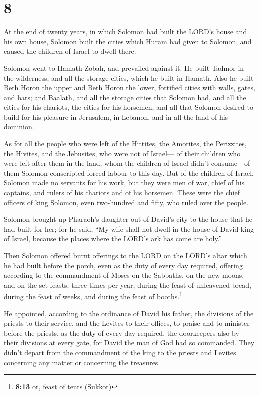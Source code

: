 \hypertarget{section-7}{%
\section{8}\label{section-7}}

 At the end of twenty years, in which Solomon had built
the LORD's house and his own house,  Solomon built the
cities which Huram had given to Solomon, and caused the children of
Israel to dwell there.

 Solomon went to Hamath Zobah, and prevailed against it.
 He built Tadmor in the wilderness, and all the storage
cities, which he built in Hamath.  Also he built Beth
Horon the upper and Beth Horon the lower, fortified cities with walls,
gates, and bars;  and Baalath, and all the storage cities
that Solomon had, and all the cities for his chariots, the cities for
his horsemen, and all that Solomon desired to build for his pleasure in
Jerusalem, in Lebanon, and in all the land of his dominion.

 As for all the people who were left of the Hittites, the
Amorites, the Perizzites, the Hivites, and the Jebusites, who were not
of Israel---  of their children who were left after them
in the land, whom the children of Israel didn't consume---of them
Solomon conscripted forced labour to this day.  But of the
children of Israel, Solomon made no servants for his work, but they were
men of war, chief of his captains, and rulers of his chariots and of his
horsemen.  These were the chief officers of king Solomon,
even two-hundred and fifty, who ruled over the people.

 Solomon brought up Pharaoh's daughter out of David's
city to the house that he had built for her; for he said, ``My wife
shall not dwell in the house of David king of Israel, because the places
where the LORD's ark has come are holy.''

 Then Solomon offered burnt offerings to the LORD on the
LORD's altar which he had built before the porch,  even
as the duty of every day required, offering according to the commandment
of Moses on the Sabbaths, on the new moons, and on the set feasts, three
times per year, during the feast of unleavened bread, during the feast
of weeks, and during the feast of booths.\footnote{\textbf{8:13} or,
  feast of tents (Sukkot)}

 He appointed, according to the ordinance of David his
father, the divisions of the priests to their service, and the Levites
to their offices, to praise and to minister before the priests, as the
duty of every day required, the doorkeepers also by their divisions at
every gate, for David the man of God had so commanded. 
They didn't depart from the commandment of the king to the priests and
Levites concerning any matter or concerning the treasures.

